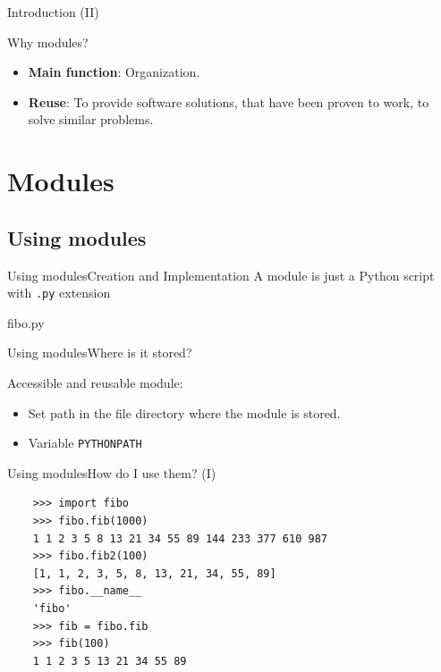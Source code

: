 \documentclass[10pt,compress]{beamer} %
\begin{document}
\begin{frame}{Introduction (II)}
		\begin{block}{Why modules?}
			\begin{itemize}
			\item \textbf{Main function}: Organization.
			\item \textbf{Reuse}: To provide software solutions, that have been proven to work, to solve similar problems.
			\end{itemize}
		\end{block}
		
\end{frame}

\section{Modules}

\subsection{Using modules}
\begin{frame}{Using modules}{Creation and Implementation}
	\vspace{-0.2cm}
	A module is just a Python script with \texttt{.py} extension
	\vspace{-0.2cm}
	\begin{block}{fibo.py}
	\vspace{-0.2cm}
	
	\vspace{-0.2cm}
	\end{block}
\end{frame}

\begin{frame}{Using modules}{Where is it stored?}

 Accessible and reusable module:
 \begin{itemize}
 \item  Set path in the file directory where the module is stored.
 \item Variable \texttt{PYTHONPATH}
 \end{itemize}
 \end{frame}
 
\begin{frame}[fragile]{Using modules}{How do I use them? (I)}
	\begin{block}{}
	\begin{verbatim}
	>>> import fibo
	>>> fibo.fib(1000)
	1 1 2 3 5 8 13 21 34 55 89 144 233 377 610 987
	>>> fibo.fib2(100)
	[1, 1, 2, 3, 5, 8, 13, 21, 34, 55, 89]
	>>> fibo.__name__
	'fibo'
	>>> fib = fibo.fib
	>>> fib(100)
	1 1 2 3 5 13 21 34 55 89
	\end{verbatim}
	\vspace{-0.2cm}
	\end{block}
\end{frame}
\end{document}
